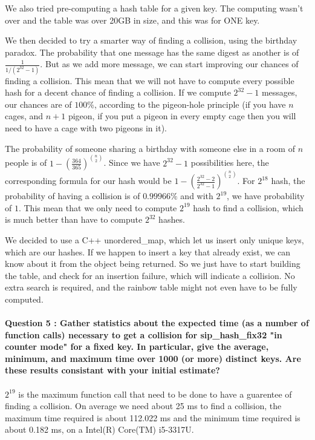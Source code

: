 \documentclass[4apaper]{report}
\begin{document}
We also tried pre-computing a hash table for a given key. The computing wasn't over and the table was over 20GB in size, and this was for ONE key.

We then decided to try a smarter way of finding a collision, using the birthday paradox. The probability that one message has the same digest as another is of $\frac{1}{1/(2^{32} - 1)}$. But as we add more message, we can start improving our chances of finding a collision. This mean that we will not have to compute every possible hash for a decent chance of finding a collision. If we compute $2^{32}-1$ messages, our chances are of $100\%$, according to the pigeon-hole principle (if you have $n$ cages, and $n+1$ pigeon, if you put a pigeon in every empty cage then you will need to have a cage with two pigeons in it).

The probability of someone sharing a birthday with someone else in a room of $n$ people is of $1 - (\frac {364}{365})^{\binom {n}{2}}$. Since we have $2^{32}-1$ possibilities here, the corresponding formula for our hash would be  $1 - (\frac {2^{32}-2}{2^{32}-1})^{\binom {n}{2}}$. For $2^{18}$ hash, the probability of having a collision is of $0.99966\%$ and with $2^{19}$, we have probability of $1$. This mean that we only need to compute $2^{19}$ hash to find a collision, which is much better than have to compute $2^{32}$ hashes.

We decided to use a C++ unordered\_map, which let us insert only unique keys, which are our hashes. If we happen to insert a key that already exist, we can know about it from the object being returned. So we just have to start building the table, and check for an insertion failure, which will indicate a collision. No extra search is required, and the rainbow table might not even have to be fully computed.

\paragraph{Question 5 : Gather statistics about the expected time (as a number of function calls) necessary to get a
collision for sip\_hash\_fix32 "in counter mode" for a fixed key. In particular, give the average, minimum, and maximum time over 1000 (or more) distinct keys. Are these results consistant
with your initial estimate?}

\paragraph{} $2^{19}$ is the maximum function call that need to be done to have a guarentee of finding a collision. On average we need about 25 ms to find a collision, the maximum time required is about 112.022 ms and the minimum time required is about 0.182 ms, on a Intel(R) Core(TM) i5-3317U.
\end{document}
